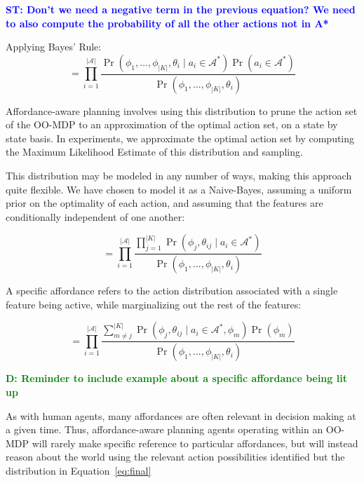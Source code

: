 \documentclass[conference]{IEEEtran}
\newcommand{\stnote}[1]{\textcolor{Blue}{\textbf{ST: #1}}}
\newcommand{\dnote}[1]{\textcolor{Green}{\textbf{D: #1}}}
\begin{document}
\stnote{Don't we need a negative term in the previous equation?  We need to also compute the probability of all the other actions not in A*}

Applying Bayes' Rule:
\begin{equation}
= \prod_{i=1}^{|\mathcal{A}|} \frac{\Pr(\phi_1, \ldots, \phi_{|K|}, \theta_i \mid a_i \in \mathcal{A}^*) \Pr(a_i \in \mathcal{A}^*)}{\Pr(\phi_1, \ldots, \phi_{|K|}, \theta_i)}
\label{eq:bayes}
\end{equation}

Affordance-aware planning involves using this distribution to prune the action set of the OO-MDP
to an approximation of the optimal action set, on a state by state basis. In experiments, we approximate
the optimal action set by computing the Maximum Likelihood Estimate of this distribution and sampling.

This distribution may be modeled in any number of ways, making this approach quite flexible.
We have chosen to model it as a Naive-Bayes, assuming a uniform prior on the optimality of each action,
and assuming that the features are conditionally independent of one another:

\begin{equation}
= \prod_{i=1}^{|\mathcal{A}|} \frac{\prod_{j=1}^{|K|} \Pr(\phi_j, \theta_{ij} \mid a_i \in \mathcal{A}^*)}{\Pr(\phi_1, \ldots, \phi_{|K|}, \theta_i)}
\label{eq:final}
\end{equation}

A specific affordance refers to the action distribution associated with a single feature being active, while marginalizing out the rest of the features:

\begin{equation}
= \prod_{i=1}^{|\mathcal{A}|} \frac{\sum_{m\not=j}^{|K|} \Pr(\phi_j, \theta_{ij} \mid a_i \in \mathcal{A}^*, \phi_m) \Pr(\phi_m)}{\Pr(\phi_1, \ldots, \phi_{|K|}, \theta_i)}
\label{eq:posterior}
\end{equation}

\dnote{Reminder to include example about a specific affordance being lit up}

As with human agents, many affordances are often relevant in decision making at a given time.
Thus, affordance-aware planning agents operating within an OO-MDP will rarely make specific
reference to particular affordances, but will instead reason about the world using the relevant
action possibilities identified but the distribution in Equation~\ref{eq:final}
\end{document}
